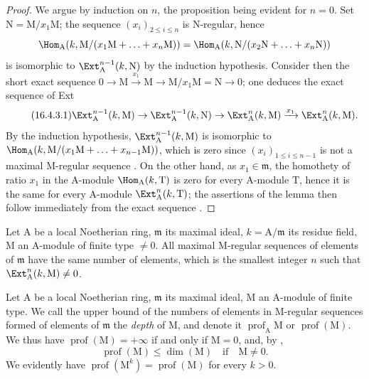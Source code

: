 \begin{proof}
We argue by induction on $n$, the proposition being evident for $n=0$.
Set $\mathrm{N}=\mathrm{M}/x_1\mathrm{M}$; the sequence $(x_i)_{2\leq i\leq n}$ is $\mathrm{N}$-regular, hence
\[
  \Hom_\mathrm{A}(k,\mathrm{M}/(x_1\mathrm{M}+\ldots+x_n\mathrm{M}))=\Hom_\mathrm{A}(k,\mathrm{N}/(x_2\mathrm{N}+\ldots+x_n\mathrm{N}))
\]
is isomorphic to $\Ext^{n-1}_\mathrm{A}(k,\mathrm{N})$ by the induction hypothesis.
Consider then the short exact sequence $0\to\mathrm{M}\xrightarrow{x_1}\mathrm{M}\to\mathrm{M}/x_1\mathrm{M}=\mathrm{N}\to 0$; one deduces the exact sequence of Ext
\begin{equation}
\label{0.16.4.3.1}
\tag{16.4.3.1}
  \Ext^{n-1}_\mathrm{A}(k,\mathrm{M})\to\Ext^{n-1}_\mathrm{A}(k,\mathrm{N})\to\Ext^n_\mathrm{A}(k,\mathrm{M})\xrightarrow{x_1}\Ext^n_\mathrm{A}(k,\mathrm{M}).
\end{equation}
By the induction hypothesis, $\Ext^{n-1}_\mathrm{A}(k,\mathrm{M})$ is isomorphic to $\Hom_\mathrm{A}(k,\mathrm{M}/(x_1\mathrm{M}+\ldots+x_{n-1}\mathrm{M}))$, which is zero since $(x_i)_{1\leq i\leq n-1}$ is not a maximal $\mathrm{M}$-regular sequence .
On the other hand, as $x_1\in\mathfrak{m}$, the homothety of ratio $x_1$ in the $\mathrm{A}$-module $\Hom_\mathrm{A}(k,\mathrm{T})$ is zero for every $\mathrm{A}$-module $\mathrm{T}$, hence it is the same for every $\mathrm{A}$-module $\Ext^n_\mathrm{A}(k,\mathrm{T})$; the assertions of the lemma then follow immediately from the exact sequence .
\end{proof}

\begin{corollary}[16.4.4]
\label{0.16.4.4}
Let $\mathrm{A}$ be a local Noetherian ring, $\mathfrak{m}$ its maximal ideal, $k=\mathrm{A}/\mathfrak{m}$ its residue field, $\mathrm{M}$ an $\mathrm{A}$-module of finite type $\neq 0$.
All maximal $\mathrm{M}$-regular sequences of elements of $\mathfrak{m}$ have the same number of elements, which is the smallest integer $n$ such that $\Ext^n_\mathrm{A}(k,\mathrm{M})\neq 0$.
\end{corollary}

\begin{definition}[16.4.5]
\label{0.16.4.5}
Let $\mathrm{A}$ be a local Noetherian ring, $\mathfrak{m}$ its maximal ideal, $\mathrm{M}$ an $\mathrm{A}$-module of finite type.
We call the upper bound of the numbers of elements in $\mathrm{M}$-regular sequences formed of elements of $\mathfrak{m}$ the \emph{depth} of $\mathrm{M}$, and denote it $\operatorname{prof}_\mathrm{A}\mathrm{M}$ or $\operatorname{prof}(\mathrm{M})$.
We thus have $\operatorname{prof}(\mathrm{M})=+\infty$ if and only if $\mathrm{M}=0$, and, by ,
\begin{equation}
\label{0.16.4.5.1}
\tag{16.4.5.1}
  \operatorname{prof}(\mathrm{M})\leq\dim(\mathrm{M})\quad\text{if}\quad\mathrm{M}\neq 0.
\end{equation}
We evidently have $\operatorname{prof}(\mathrm{M}^k)=\operatorname{prof}(\mathrm{M})$ for every $k>0$.
\end{definition}

